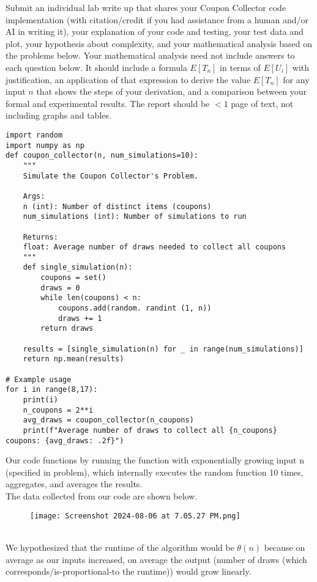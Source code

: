 \documentclass[solution,letterpaper]{cs20}
\begin{document}


    \begin{problem}
        Submit an individual lab write up that shares your Coupon Collector code implementation (with citation/credit if you had assistance from a human and/or AI in writing it), your explanation of your code and testing, your test data and plot, your hypothesis about complexity, and your mathematical analysis based on the problems below. Your mathematical analysis need not include answers to each question below. It should include a formula $E[T_n]$ in terms of $E[U_i]$ with justification, an application of that expression to derive the value $E[T_n]$ for any input $n$ that shows the steps of your derivation, and a comparison between your formal and experimental results. The report should be $<1$ page of text, not including graphs and tables.

        \begin{solution}
            \begin{lstlisting}
import random
import numpy as np
def coupon_collector(n, num_simulations=10):
    """
    Simulate the Coupon Collector's Problem.

    Args:
    n (int): Number of distinct items (coupons)
    num_simulations (int): Number of simulations to run

    Returns:
    float: Average number of draws needed to collect all coupons
    """
    def single_simulation(n):
        coupons = set()
        draws = 0
        while len(coupons) < n:
            coupons.add(random. randint (1, n))
            draws += 1
        return draws

    results = [single_simulation(n) for _ in range(num_simulations)]
    return np.mean(results)

# Example usage
for i in range(8,17):
    print(i)
    n_coupons = 2**i
    avg_draws = coupon_collector(n_coupons)
    print(f"Average number of draws to collect all {n_coupons} coupons: {avg_draws: .2f}")
            \end{lstlisting}

            Our code functions by running the function  \texttt{} with exponentially growing input n (specified in problem), which internally executes the random function \texttt{} 10 times, aggregates, and averages the results. \\
            The data collected from our code are shown below. \\
            \begin{figure}[h]
                \centering
                \texttt{[image: Screenshot 2024-08-06 at 7.05.27 PM.png]}
\end{figure} \\
We hypothesized that the runtime of the algorithm would be $\theta(n)$ because on average as our inputs increased, on average the output (number of draws (which corresponds/is-proportional-to the runtime)) would grow linearly. \\


\end{solution}
\end{problem}
\end{document}
